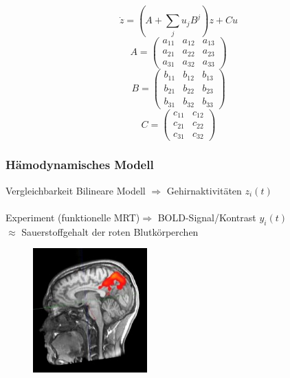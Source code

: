 \documentclass{beamer}
\begin{document}
	\begin{frame}{}
		\[\dot{z}=(A+\sum_{j}u_jB^j)z+Cu\]
		  \[
		 A=\left(\begin{array}{ccc} 
		  a_{11} &  a_{12} & a_{13} \\a_{21} &  a_{22} & a_{23} \\a_{31} &  a_{32} & a_{33}
		  \end{array}\right) 
		  \]
		  \[
		  B=\left(\begin{array}{ccc} 
		  b_{11} &  b_{12} & b_{13} \\b_{21} &  b_{22} & b_{23} \\b_{31} &  b_{32} & b_{33}
		  \end{array}\right) 
		  \]
		  \[
		  C=\left(\begin{array}{cc} 
		  c_{11} &  c_{12} \\c_{21} &  c_{22} \\c_{31} &  c_{32} 
		  \end{array}\right) 
		  \]
	\end{frame}
	
\subsubsection{Hämodynamisches Modell}
\begin{frame}{Vergleichbarkeit}
Bilineare Modell $\Rightarrow$ Gehirnaktivitäten $z_i(t)$\\~\\
\pause
Experiment (funktionelle MRT)$\Rightarrow$ BOLD-Signal/Kontrast $y_i(t)$\\
\hspace{3cm} $\approx$ Sauerstoffgehalt der roten Blutkörperchen 
\begin{figure}
{\includegraphics[width=4.4cm]{res/bold_signal.jpg}}
\end{figure}
\end{frame}
\end{document}
